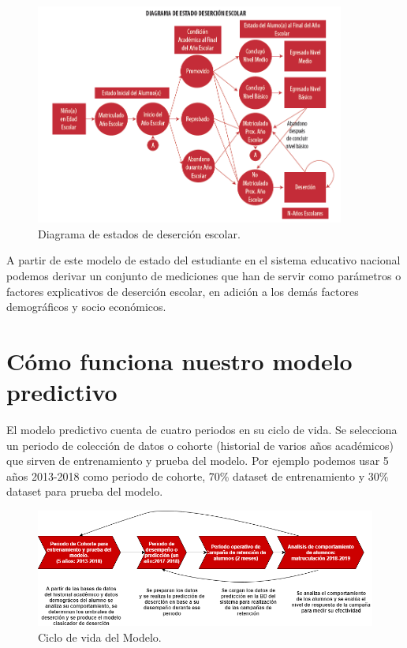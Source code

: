 \documentclass[12pt]{article}
\begin{document}
\begin{figure}[!h]
\centering
\includegraphics[width=4.0in]{diagrama_desercion.PNG}
\caption{Diagrama de estados de deserción escolar.}
\end{figure}

A partir de este modelo de estado del estudiante en el sistema educativo nacional podemos derivar un conjunto de mediciones que han de servir como parámetros
o factores explicativos de deserción escolar, en adición a los demás factores demográficos y socio económicos.

\section{Cómo funciona nuestro modelo predictivo}

El modelo predictivo cuenta de cuatro periodos en su ciclo de vida. Se selecciona un periodo de colección de datos o cohorte (historial de varios años académicos) que sirven de entrenamiento y prueba del modelo. Por ejemplo podemos usar 5 años 2013-2018 como periodo de cohorte, 70\% dataset de entrenamiento y 30\% dataset para prueba del modelo.

\begin{figure}[!h]
\centering
\includegraphics[width=6.0in]{model.png}
\caption{Ciclo de vida del Modelo.}
\end{figure}
\end{document}
